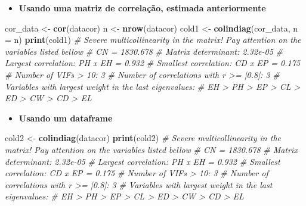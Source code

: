 \documentclass[
]{book}
\newenvironment{Shaded}{\begin{snugshade}}{\end{snugshade}}
\newcommand{\CommentTok}[1]{\textcolor[rgb]{0.56,0.35,0.01}{\textit{#1}}}
\newcommand{\DataTypeTok}[1]{\textcolor[rgb]{0.13,0.29,0.53}{#1}}
\newcommand{\KeywordTok}[1]{\textcolor[rgb]{0.13,0.29,0.53}{\textbf{#1}}}
\newcommand{\NormalTok}[1]{#1}
\newcommand{\StringTok}[1]{\textcolor[rgb]{0.31,0.60,0.02}{#1}}
\providecommand{\tightlist}{%
  \setlength{\itemsep}{0pt}\setlength{\parskip}{0pt}}
\numberwithin{equation}{section}
\begin{document}
\begin{itemize}
\tightlist
\item
  \textbf{Usando uma matriz de correlação, estimada anteriormente}
\end{itemize}

\begin{Shaded}
\begin{Highlighting}[]
\NormalTok{cor\_data \textless{}{-}}\StringTok{ }\KeywordTok{cor}\NormalTok{(datacor)}
\NormalTok{n \textless{}{-}}\StringTok{ }\KeywordTok{nrow}\NormalTok{(datacor)}
\NormalTok{cold1 \textless{}{-}}\StringTok{ }\KeywordTok{colindiag}\NormalTok{(cor\_data, }\DataTypeTok{n =}\NormalTok{ n)}
\KeywordTok{print}\NormalTok{(cold1)}
\CommentTok{\# Severe multicollinearity in the matrix! Pay attention on the variables listed bellow}
\CommentTok{\# CN = 1830.678}
\CommentTok{\# Matrix determinant: 2.32e{-}05 }
\CommentTok{\# Largest correlation: PH x EH = 0.932 }
\CommentTok{\# Smallest correlation: CD x EP = 0.175 }
\CommentTok{\# Number of VIFs \textgreater{} 10: 3 }
\CommentTok{\# Number of correlations with r \textgreater{}= |0.8|: 3 }
\CommentTok{\# Variables with largest weight in the last eigenvalues: }
\CommentTok{\# EH \textgreater{} PH \textgreater{} EP \textgreater{} CL \textgreater{} ED \textgreater{} CW \textgreater{} CD \textgreater{} EL}
\end{Highlighting}
\end{Shaded}

\begin{itemize}
\tightlist
\item
  \textbf{Usando um dataframe}
\end{itemize}

\begin{Shaded}
\begin{Highlighting}[]
\NormalTok{cold2 \textless{}{-}}\StringTok{ }\KeywordTok{colindiag}\NormalTok{(datacor)}
\KeywordTok{print}\NormalTok{(cold2)}
\CommentTok{\# Severe multicollinearity in the matrix! Pay attention on the variables listed bellow}
\CommentTok{\# CN = 1830.678}
\CommentTok{\# Matrix determinant: 2.32e{-}05 }
\CommentTok{\# Largest correlation: PH x EH = 0.932 }
\CommentTok{\# Smallest correlation: CD x EP = 0.175 }
\CommentTok{\# Number of VIFs \textgreater{} 10: 3 }
\CommentTok{\# Number of correlations with r \textgreater{}= |0.8|: 3 }
\CommentTok{\# Variables with largest weight in the last eigenvalues: }
\CommentTok{\# EH \textgreater{} PH \textgreater{} EP \textgreater{} CL \textgreater{} ED \textgreater{} CW \textgreater{} CD \textgreater{} EL}
\end{Highlighting}
\end{Shaded}
\end{document}
